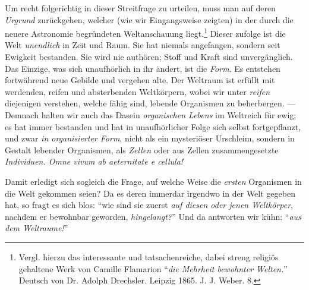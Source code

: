 \documentclass[a4paper, 11pt, oneside, english]{article}
\begin{document}
Um recht folgerichtig in dieser Streitfrage zu urteilen, muss man auf deren \emph{Urgrund} zurückgehen, welcher (wie wir Eingangsweise zeigten) in der durch die neuere Astronomie begründeten Weltanschauung liegt.\footnote{Vergl. hierzu das interessante und tatsachenreiche, dabei streng religiös gehaltene Werk von Camille Flamarion "`\emph{die Mehrheit bewohnter Welten.}"' Deutsch von Dr. Adolph Drechsler. Leipzig 1865. J. J. Weber. 8.} Dieser zufolge ist die Welt \emph{unendlich} in Zeit und Raum. Sie hat niemals angefangen, sondern seit Ewigkeit bestanden. Sie wird nie authören; Stoff und Kraft sind unvergänglich. Das Einzige, was sich unaufhörlich in ihr ändert, ist die \emph{Form}. Es entstehen fortwährend neue Gebilde und vergehen alte. Der Weltraum ist erfüllt mit werdenden, reifen und absterbenden Weltkörpern, wobei wir unter \emph{reifen} diejenigen verstehen, welche fähig sind, lebende Organismen zu beherbergen. --- Demnach halten wir auch das Dasein \emph{organischen Lebens} im Weltreich für ewig; es hat immer bestanden und hat in unaufhörlicher Folge sich selbst fortgepflanzt, und zwar \emph{in organisierter Form}, nicht als ein mysteriöser Urschleim, sondern in Gestalt lebender Organismen, als \emph{Zellen} oder aus Zellen zusammengesetzte \emph{Individuen. Omne vivum ab aeternitate e cellula!}

Damit erledigt sich sogleich die Frage, auf welche Weise die \emph{ersten} Organismen in die Welt gekommen seien? Da es deren immerdar irgendwo in der Welt gegeben hat, so fragt es sich blos: "`wie sind sie zuerst \emph{auf diesen oder jenen Weltkörper}, nachdem er bewohnbar geworden, \emph{hingelangt?}"' Und da antworten wir kühn: "`\emph{aus dem Weltraume!}"'
\end{document}
